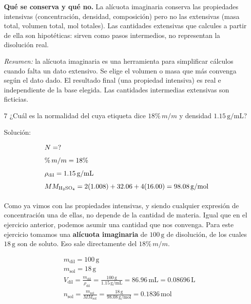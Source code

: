 \textbf{Qué se conserva y qué no.} La alícuota imaginaria conserva las 
propiedades intensivas (concentración, densidad, composición) pero no las 
extensivas (masa total, volumen total, mol totales). Las cantidades 
extensivas que calcules a partir de ella son hipotéticas: sirven como pasos 
intermedios, no representan la disolución real.

\textit{Resumen:} la alícuota imaginaria es una herramienta para simplificar 
cálculos cuando falta un dato extensivo. Se elige el volumen o masa que más 
convenga según el dato dado. El resultado final (una propiedad intensiva) es 
real e independiente de la base elegida. Las cantidades intermedias 
extensivas son ficticias.

\begin{exercise}{7}{}
¿Cuál es la normalidad del  cuya etiqueta dice $18\%\,m/m$ y 
densidad $1.15\,\mathrm{g/mL}$?

Solución:

\begin{align*}
    &N = ? \\[4pt]
    &\%\,m/m = 18\% \\[4pt]
    &\rho_{\mathrm{dil}} = 1.15\,\mathrm{g/mL} \\[4pt]
    &MM_{\ce{H2SO4}} = 2(1.008) + 32.06 + 4(16.00) = 98.08\,\mathrm{g/mol} \\[4pt]
\end{align*}

Como ya vimos con las propiedades intensivas, y siendo cualquier expresión de 
concentración una de ellas, no depende de la cantidad de materia. Igual que en 
el ejercicio anterior, podemos asumir una cantidad que nos convenga. Para este 
ejercicio tomamos una \textbf{alícuota imaginaria} de $100\,\mathrm{g}$ de 
disolución, de los cuales $18\,\mathrm{g}$ son de soluto. Eso sale directamente 
del $18\%\,m/m$.

\begin{align*}
    &m_{\mathrm{dil}} = 100\,\mathrm{g} \\[4pt]
    &m_{\mathrm{sol}} = 18\,\mathrm{g} \\[4pt]
    &V_{\mathrm{dil}} = \frac{m_{\mathrm{dil}}}{\rho_{\mathrm{dil}}}
    = \frac{100\,\mathrm{g}}{1.15\,\mathrm{g/mL}}
    = 86.96\,\mathrm{mL} = 0.08696\,\mathrm{L}\\[4pt]
    &n_{\mathrm{sol}} = \frac{m_{\mathrm{sol}}}{MM_{\mathrm{sol}}}
    = \frac{18\,\mathrm{g} }{98.08\,\mathrm{g/mol}}
    = 0.1836\,\mathrm{mol}
\end{align*}


\end{exercise}
